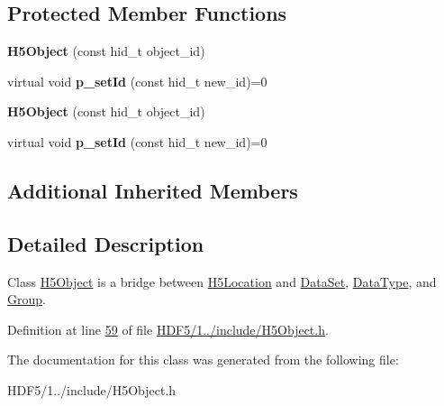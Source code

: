 \subsection*{Protected Member Functions}
\begin{DoxyCompactItemize}
\item 
\mbox{\label{class_h5_1_1_h5_object_aaedb5e2d949e1f38817a770e564def5c}} 
{\bfseries H5\+Object} (const hid\+\_\+t object\+\_\+id)
\item 
\mbox{\label{class_h5_1_1_h5_object_a91d6f3af34cd3a39682ec3e2eff4e7e6}} 
virtual void {\bfseries p\+\_\+set\+Id} (const hid\+\_\+t new\+\_\+id)=0
\item 
\mbox{\label{class_h5_1_1_h5_object_aaedb5e2d949e1f38817a770e564def5c}} 
{\bfseries H5\+Object} (const hid\+\_\+t object\+\_\+id)
\item 
\mbox{\label{class_h5_1_1_h5_object_a91d6f3af34cd3a39682ec3e2eff4e7e6}} 
virtual void {\bfseries p\+\_\+set\+Id} (const hid\+\_\+t new\+\_\+id)=0
\end{DoxyCompactItemize}
\subsection*{Additional Inherited Members}


\subsection{Detailed Description}
Class \hyperlink{class_h5_1_1_h5_object}{H5\+Object} is a bridge between \hyperlink{class_h5_1_1_h5_location}{H5\+Location} and \hyperlink{class_h5_1_1_data_set}{Data\+Set}, \hyperlink{class_h5_1_1_data_type}{Data\+Type}, and \hyperlink{class_h5_1_1_group}{Group}. 

Definition at line \hyperlink{_h_d_f5_21_810_81_2include_2_h5_object_8h_source_l00059}{59} of file \hyperlink{_h_d_f5_21_810_81_2include_2_h5_object_8h_source}{H\+D\+F5/1../include/\+H5\+Object.\+h}.



The documentation for this class was generated from the following file\+:\begin{DoxyCompactItemize}
\item 
H\+D\+F5/1../include/\+H5\+Object.\+h\end{DoxyCompactItemize}
